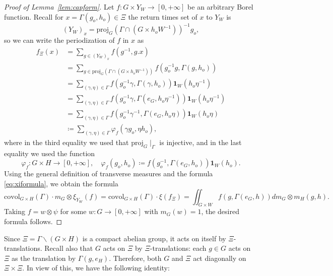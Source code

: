 \documentclass{amsart}
\numberwithin{equation}{subsection}
\theoremstyle{remark}
\begin{document}
\begin{proof}[Proof of Lemma~\ref{lem:capform}]
Let \(f:G\times Y_{W}\to\left[0,+\infty\right]\) be an arbitrary Borel function. Recall for \(x=\Gamma\left(g_{o},h_{o}\right)\in\Xi\) the return times set of \(x\) to \(Y_{W}\) is
\[\left(Y_{W}\right)_{x}=\mathrm{proj}_{G}\left(\Gamma\cap\left(G\times h_{o}W^{-1}\right)\right)^{-1}g_{o},\]
so we can write the periodization of \(f\) in \(x\) as
\begin{align*}
f_{\Xi}\left(x\right)
&=\sum\nolimits_{g\in\left(Y_{W}\right)_{x}}f\left(g^{-1},g.x\right)\\
&=\sum\nolimits_{g\in\mathrm{proj}_{G}\left(\Gamma\cap\left(G\times h_{o}W^{-1}\right)\right)}f\left(g_{o}^{-1}g,\Gamma\left(g,h_{o}\right)\right)\\
&=\sum\nolimits_{\left(\gamma,\eta\right)\in\Gamma}f\left(g_{o}^{-1}\gamma,\Gamma\left(\gamma,h_{o}\right)\right)\mathbf{1}_{W}\left(h_{o}\eta^{-1}\right)\\
&=\sum\nolimits_{\left(\gamma,\eta\right)\in\Gamma}f\left(g_{o}^{-1}\gamma,\Gamma\left(e_{G},h_{o}\eta^{-1}\right)\right)\mathbf{1}_{W}\left(h_{o}\eta^{-1}\right)\\
&=\sum\nolimits_{\left(\gamma,\eta\right)\in\Gamma}f\left(g_{o}^{-1}\gamma^{-1},\Gamma\left(e_{G},h_{o}\eta\right)\right)\mathbf{1}_{W}\left(h_{o}\eta\right)\\
&\coloneqq\sum\nolimits_{\left(\gamma,\eta\right)\in\Gamma}\varphi_{f}\left(\gamma g_{o},\eta h_{o}\right),
\end{align*}
where in the third equality we used that \(\mathrm{proj}_{G}\mid_{\Gamma}\) is injective, and in the last equality we used the function
\[\varphi_{f}:G\times H\to\left[0,+\infty\right],\quad\varphi_{f}\left(g_{o},h_{o}\right)\coloneqq f\left(g_{o}^{-1},\Gamma\left(e_{G},h_{o}\right)\right)\mathbf{1}_{W}\left(h_{o}\right).\]
Using the general definition of transverse measures and the formula \eqref{eq:xiformula}, we obtain the formula
\[\mathrm{covol}_{G\times H}\left(\Gamma\right)\cdot m_{G}\otimes\xi_{Y_{W}}\left(f\right)	=\mathrm{covol}_{G\times H}\left(\Gamma\right)\cdot\xi\left(f_{\Xi}\right)=\iint\nolimits_{G\times W}f\left(g,\Gamma\left(e_{G},h\right)\right)dm_{G}\otimes m_{H}\left(g,h\right).\]
Taking \(f=w\otimes\psi\) for some \(w:G\to\left[0,+\infty\right]\) with \(m_{G}\left(w\right)=1\), the desired formula follows.
\end{proof}

Since \(\Xi=\Gamma\backslash\left(G\times H\right)\) is a compact abelian group, it acts on itself by \(\Xi\)-translations. Recall also that \(G\) acts on \(\Xi\) by \(\Xi\)-translations: each \(g\in G\) acts on \(\Xi\) as the translation by \(\Gamma\left(g,e_{H}\right)\). Therefore, both \(G\) and \(\Xi\) act diagonally on \(\Xi\times\Xi\). In view of this, we have the following identity:
\end{document}
